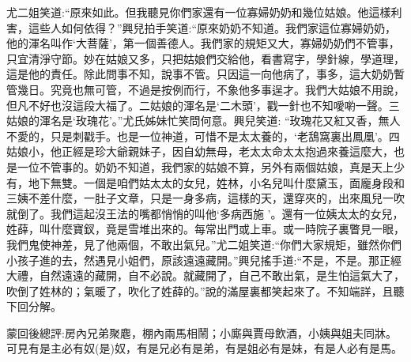 \begin{parag}
    尤二姐笑道:“原來如此。但我聽見你們家還有一位寡婦奶奶和幾位姑娘。他這樣利害，這些人如何依得？”興兒拍手笑道:“原來奶奶不知道。我們家這位寡婦奶奶，他的渾名叫作‘大菩薩’，第一個善德人。我們家的規矩又大，寡婦奶奶們不管事，只宜清淨守節。妙在姑娘又多，只把姑娘們交給他，看書寫字，學針線，學道理，這是他的責任。除此問事不知，說事不管。只因這一向他病了，事多，這大奶奶暫管幾日。究竟也無可管，不過是按例而行，不象他多事逞才。我們大姑娘不用說，但凡不好也沒這段大福了。二姑娘的渾名是‘二木頭’，戳一針也不知噯喲一聲。三姑娘的渾名是‘玫瑰花’。”尤氏姊妹忙笑問何意。興兒笑道: “玫瑰花又紅又香，無人不愛的，只是刺戳手。也是一位神道，可惜不是太太養的，‘老鴰窩裏出鳳凰’。四姑娘小，他正經是珍大爺親妹子，因自幼無母，老太太命太太抱過來養這麼大，也是一位不管事的。奶奶不知道，我們家的姑娘不算，另外有兩個姑娘，真是天上少有，地下無雙。一個是咱們姑太太的女兒，姓林，小名兒叫什麼黛玉，面龐身段和三姨不差什麼，一肚子文章，只是一身多病，這樣的天，還穿夾的，出來風兒一吹就倒了。我們這起沒王法的嘴都悄悄的叫他‘多病西施 ’。還有一位姨太太的女兒，姓薛，叫什麼寶釵，竟是雪堆出來的。每常出門或上車。或一時院子裏瞥見一眼，我們鬼使神差，見了他兩個，不敢出氣兒。”尤二姐笑道:“你們大家規矩，雖然你們小孩子進的去，然遇見小姐們，原該遠遠藏開。”興兒搖手道:“不是，不是。那正經大禮，自然遠遠的藏開，自不必說。就藏開了，自己不敢出氣，是生怕這氣大了，吹倒了姓林的；氣暖了，吹化了姓薛的。”說的滿屋裏都笑起來了。不知端詳，且聽下回分解。
\end{parag}


\begin{parag}
    \begin{note}蒙回後總評:房內兄弟聚麀，棚內兩馬相鬧；小廝與賈母飲酒，小姨與姐夫同牀。可見有是主必有奴(是)奴，有是兄必有是弟，有是姐必有是妹，有是人必有是馬。\end{note}
\end{parag}

